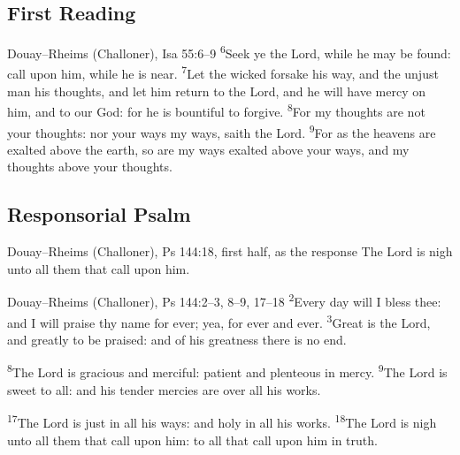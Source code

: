 \subsection{First Reading}
\label{proper-first-reading}


\begin{englishwitness}{Douay--Rheims (Challoner), Isa 55:6--9}
\textsuperscript{6}Seek ye the Lord, while he may be found: call upon him,
while he is near. \textsuperscript{7}Let the wicked forsake his way, and the
unjust man his thoughts, and let him return to the Lord, and he will have
mercy on him, and to our God: for he is bountiful to forgive.
\textsuperscript{8}For my thoughts are not your thoughts: nor your ways my
ways, saith the Lord. \textsuperscript{9}For as the heavens are exalted above
the earth, so are my ways exalted above your ways, and my thoughts above your
thoughts.
\end{englishwitness}

\subsection{Responsorial Psalm}
\label{proper-responsorial-psalm}


\begin{englishwitness}{Douay--Rheims (Challoner), Ps 144:18, first half, as the response}
The Lord is nigh unto all them that call upon him.
\end{englishwitness}

\begin{englishwitness}{Douay--Rheims (Challoner), Ps 144:2--3, 8--9, 17--18}
\textsuperscript{2}Every day will I bless thee: and I will praise thy name for
ever; yea, for ever and ever. \textsuperscript{3}Great is the Lord, and
greatly to be praised: and of his greatness there is no end.

\textsuperscript{8}The Lord is gracious and merciful: patient and plenteous in
mercy. \textsuperscript{9}The Lord is sweet to all: and his tender mercies are
over all his works.

\textsuperscript{17}The Lord is just in all his ways: and holy in all his
works. \textsuperscript{18}The Lord is nigh unto all them that call upon him:
to all that call upon him in truth.
\end{englishwitness}

